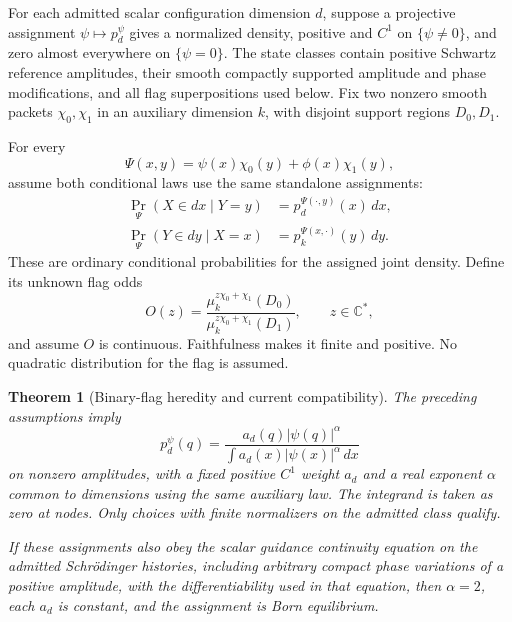 \documentclass[11pt]{article}
\numberwithin{equation}{section}
\newtheorem{theorem}{Theorem}[section]
\theoremstyle{definition}
\newcommand{\C}{\mathbb C}
\begin{document}
For each admitted scalar configuration dimension \(d\), suppose a projective assignment \(\psi\mapsto p_d^\psi\) gives a normalized density, positive and \(C^1\) on \(\{\psi\ne0\}\), and zero almost everywhere on \(\{\psi=0\}\). The state classes contain positive Schwartz reference amplitudes, their smooth compactly supported amplitude and phase modifications, and all flag superpositions used below. Fix two nonzero smooth packets \(\chi_0,\chi_1\) in an auxiliary dimension \(k\), with disjoint support regions \(D_0,D_1\).

For every
\[
 \Psi(x,y)=\psi(x)\chi_0(y)+\phi(x)\chi_1(y),
\]
assume both conditional laws use the same standalone assignments:
\begin{align}
 \Pr_\Psi(X\in dx\mid Y=y)&=p_d^{\Psi(\cdot,y)}(x)\,dx,\label{eq:heredityX}\\
 \Pr_\Psi(Y\in dy\mid X=x)&=p_k^{\Psi(x,\cdot)}(y)\,dy.\label{eq:heredityY}
\end{align}
These are ordinary conditional probabilities for the assigned joint density. Define its unknown flag odds
\[
 O(z)=\frac{\mu_k^{z\chi_0+\chi_1}(D_0)}
                {\mu_k^{z\chi_0+\chi_1}(D_1)},\qquad z\in\C^*,
\]
and assume \(O\) is continuous. Faithfulness makes it finite and positive. No quadratic distribution for the flag is assumed.

\begin{theorem}[Binary-flag heredity and current compatibility]\label{thm:heredity}
The preceding assumptions imply
\begin{equation}\label{eq:powers}
 p_d^\psi(q)=\frac{a_d(q)|\psi(q)|^\alpha}
                   {\int a_d(x)|\psi(x)|^\alpha\,dx}
\end{equation}
on nonzero amplitudes, with a fixed positive \(C^1\) weight \(a_d\) and a real exponent \(\alpha\) common to dimensions using the same auxiliary law. The integrand is taken as zero at nodes. Only choices with finite normalizers on the admitted class qualify.

If these assignments also obey the scalar guidance continuity equation on the admitted Schr\"odinger histories, including arbitrary compact phase variations of a positive amplitude, with the differentiability used in that equation, then \(\alpha=2\), each \(a_d\) is constant, and the assignment is Born equilibrium.
\end{theorem}
\end{document}
